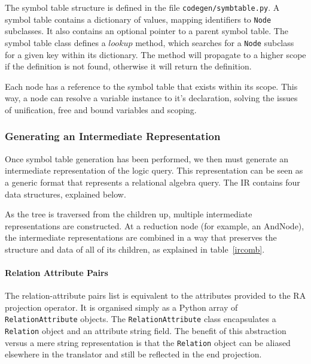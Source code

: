 \documentclass[a4paper, 11pt]{article}
\begin{document}
      The symbol table structure is defined in the file
      \texttt{codegen/symbtable.py}. A symbol table contains a dictionary of
      values, mapping identifiers to \texttt{Node} subclasses. It also contains an
      optional pointer to a parent symbol table. The symbol table class defines
      a $lookup$ method, which searches for a \texttt{Node} subclass for a given key
      within its dictionary. The method will propagate to a higher scope if the
      definition is not found, otherwise it will return the definition.

      Each node has a reference to the symbol table that exists within its
      scope. This way, a node can resolve a variable instance to it's
      declaration, solving the issues of unification, free and bound variables
      and scoping.

    \subsubsection{Generating an Intermediate Representation}

      Once symbol table generation has been performed, we then must generate an
      intermediate representation of the logic query. This representation can
      be seen as a generic format that represents a relational algebra
      query. The IR contains four data structures, explained below.

      As the tree is traversed from the children up, multiple intermediate
      representations are constructed. At a reduction node (for example, an
      AndNode), the intermediate representations are combined in a way that
      preserves the structure and data of all of its children, as explained in
      table~\ref{ircomb}.


      \paragraph{Relation Attribute Pairs}
            The relation-attribute pairs list is equivalent to the attributes
            provided to the RA projection operator. It is
            organised simply as a Python array of \texttt{RelationAttribute} objects.
            The \texttt{RelationAttribute} class encapsulates a
            \texttt{Relation} object and an
            attribute string field. The benefit of this abstraction versus a
            mere string representation is that the \texttt{Relation} object can be
            aliased elsewhere in the translator and still be reflected in the
            end projection.
\end{document}
